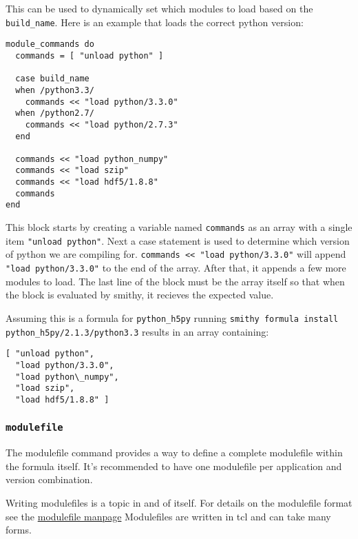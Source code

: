 \documentclass{acm_proc_article-sp}
\begin{document}
This can be used to dynamically set which modules to load based on the
\texttt{build\_name}. Here is an example that loads the correct python version:

\begin{quoting}
\begin{verbatim}
module_commands do
  commands = [ "unload python" ]

  case build_name
  when /python3.3/
    commands << "load python/3.3.0"
  when /python2.7/
    commands << "load python/2.7.3"
  end

  commands << "load python_numpy"
  commands << "load szip"
  commands << "load hdf5/1.8.8"
  commands
end
\end{verbatim}
\end{quoting}

This block starts by creating a variable named \texttt{commands} as an array with a
single item \texttt{"unload python"}. Next a case statement is used to determine which
version of python we are compiling for. \texttt{commands << "load python/3.3.0"} will
append \texttt{"load python/3.3.0"} to the end of the array.  After that, it appends a
few more modules to load.  The last line of the block must be the array itself
so that when the block is evaluated by smithy, it recieves the expected value.

Assuming this is a formula for \texttt{python\_h5py} running \texttt{smithy
formula install python\_h5py/2.1.3/python3.3} results in an array containing:

\begin{quoting}
\begin{verbatim}
[ "unload python",
  "load python/3.3.0",
  "load python\_numpy",
  "load szip",
  "load hdf5/1.8.8" ]
\end{verbatim}
\end{quoting}

\subsubsection{\texttt{modulefile}}

The modulefile command provides a way to define a complete modulefile within the
formula itself. It's recommended to have one modulefile per application and version combination.

Writing modulefiles is a topic in and of itself. For details on the modulefile
format see the
\href{http://modules.sourceforge.net/man/modulefile.html}{modulefile manpage}
Modulefiles are written in tcl and can take many forms.
\end{document}
